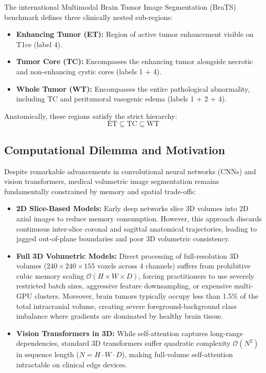\documentclass[12pt, a4paper]{article}
\begin{document}
The international Multimodal Brain Tumor Image Segmentation (BraTS) benchmark defines three clinically nested sub-regions:
\begin{itemize}[leftmargin=*, itemsep=4pt]
    \item \textbf{Enhancing Tumor (ET):} Region of active tumor enhancement visible on T1ce (label 4).
    \item \textbf{Tumor Core (TC):} Encompasses the enhancing tumor alongside necrotic and non-enhancing cystic cores (labels 1 + 4).
    \item \textbf{Whole Tumor (WT):} Encompasses the entire pathological abnormality, including TC and peritumoral vasogenic edema (labels 1 + 2 + 4).
\end{itemize}

Anatomically, these regions satisfy the strict hierarchy:
\begin{equation}
    \text{ET} \subseteq \text{TC} \subseteq \text{WT}
\end{equation}

\subsection{Computational Dilemma and Motivation}
Despite remarkable advancements in convolutional neural networks (CNNs) and vision transformers, medical volumetric image segmentation remains fundamentally constrained by memory and spatial trade-offs:
\begin{itemize}[leftmargin=*, itemsep=4pt]
    \item \textbf{2D Slice-Based Models:} Early deep networks slice 3D volumes into 2D axial images to reduce memory consumption. However, this approach discards continuous inter-slice coronal and sagittal anatomical trajectories, leading to jagged out-of-plane boundaries and poor 3D volumetric consistency.
    \item \textbf{Full 3D Volumetric Models:} Direct processing of full-resolution 3D volumes ($240 \times 240 \times 155$ voxels across 4 channels) suffers from prohibitive cubic memory scaling $\mathcal{O}(H \times W \times D)$, forcing practitioners to use severely restricted batch sizes, aggressive feature downsampling, or expensive multi-GPU clusters. Moreover, brain tumors typically occupy less than 1.5\% of the total intracranial volume, creating severe foreground-background class imbalance where gradients are dominated by healthy brain tissue.
    \item \textbf{Vision Transformers in 3D:} While self-attention captures long-range dependencies, standard 3D transformers suffer quadratic complexity $\mathcal{O}(N^2)$ in sequence length ($N = H \cdot W \cdot D$), making full-volume self-attention intractable on clinical edge devices.
\end{itemize}
\end{document}
